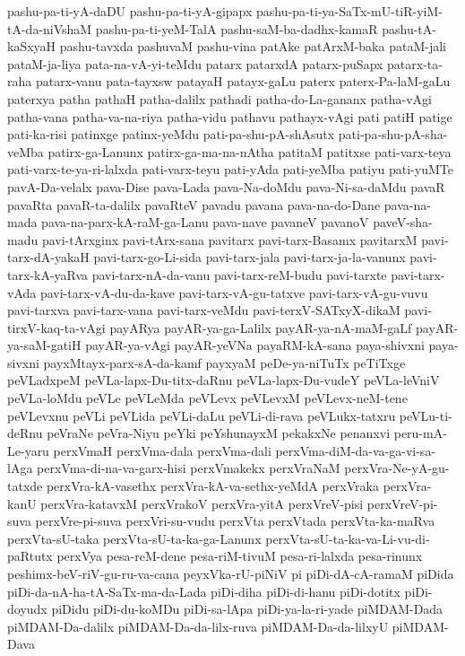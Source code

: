 {pashu-pa-ti-yA-daDU
pashu-pa-ti-yA-gipapx
pashu-pa-ti-ya-SaTx-mU-tiR-yiM-tA-da-niVshaM
pashu-pa-ti-yeM-TalA
pashu-saM-ba-dadhx-kamaR
pashu-tA-kaSxyaH
pashu-tavxda
pashuvaM
pashu-vina
patAke
patArxM-baka
pataM-jali
pataM-ja-liya
pata-na-vA-yi-teMdu
patarx
patarxdA
patarx-puSapx
patarx-ta-raha
patarx-vanu
pata-tayxsw
patayaH
patayx-gaLu
paterx
paterx-Pa-laM-gaLu
paterxya
patha
pathaH
patha-dalilx
pathadi
patha-do-La-gananx
patha-vAgi
patha-vana
patha-va-na-riya
patha-vidu
pathavu
pathayx-vAgi
pati
patiH
patige
pati-ka-risi
patinxge
patinx-yeMdu
pati-pa-shu-pA-shAsutx
pati-pa-shu-pA-sha-veMba
patirx-ga-Lanunx
patirx-ga-ma-na-nAtha
patitaM
patitxse
pati-varx-teya
pati-varx-te-ya-ri-lalxda
pati-varx-teyu
pati-yAda
pati-yeMba
patiyu
pati-yuMTe
pavA-Da-velalx
pava-Dise
pava-Lada
pava-Na-doMdu
pava-Ni-sa-daMdu
pavaR
pavaRta
pavaR-ta-dalilx
pavaRteV
pavadu
pavana
pava-na-do-Dane
pava-na-mada
pava-na-parx-kA-raM-ga-Lanu
pava-nave
pavaneV
pavanoV
paveV-sha-madu
pavi-tArxginx
pavi-tArx-sana
pavitarx
pavi-tarx-Basamx
pavitarxM
pavi-tarx-dA-yakaH
pavi-tarx-go-Li-sida
pavi-tarx-jala
pavi-tarx-ja-la-vanunx
pavi-tarx-kA-yaRva
pavi-tarx-nA-da-vanu
pavi-tarx-reM-budu
pavi-tarxte
pavi-tarx-vAda
pavi-tarx-vA-du-da-kave
pavi-tarx-vA-gu-tatxve
pavi-tarx-vA-gu-vuvu
pavi-tarxva
pavi-tarx-vana
pavi-tarx-veMdu
pavi-terxV-SATxyX-dikaM
pavi-tirxV-kaq-ta-vAgi
payARya
payAR-ya-ga-Lalilx
payAR-ya-nA-maM-gaLf
payAR-ya-saM-gatiH
payAR-ya-vAgi
payAR-yeVNa
payaRM-kA-sana
paya-shivxni
paya-sivxni
payxMtayx-parx-sA-da-kamf
payxyaM
peDe-ya-niTuTx
peTiTxge
peVLadxpeM
peVLa-lapx-Du-titx-daRnu
peVLa-lapx-Du-vudeY
peVLa-leVniV
peVLa-loMdu
peVLe
peVLeMda
peVLevx
peVLevxM
peVLevx-neM-tene
peVLevxnu
peVLi
peVLida
peVLi-daLu
peVLi-di-rava
peVLukx-tatxru
peVLu-ti-deRnu
peVraNe
peVra-Niyu
peYki
peYshunayxM
pekakxNe
penanxvi
peru-mA-Le-yaru
perxVmaH
perxVma-dala
perxVma-dali
perxVma-diM-da-va-ga-vi-sa-lAga
perxVma-di-na-va-garx-hisi
perxVmakekx
perxVraNaM
perxVra-Ne-yA-gu-tatxde
perxVra-kA-vasethx
perxVra-kA-va-sethx-yeMdA
perxVraka
perxVra-kanU
perxVra-katavxM
perxVrakoV
perxVra-yitA
perxVreV-pisi
perxVreV-pi-suva
perxVre-pi-suva
perxVri-su-vudu
perxVta
perxVtada
perxVta-ka-maRva
perxVta-sU-taka
perxVta-sU-ta-ka-ga-Lanunx
perxVta-sU-ta-ka-va-Li-vu-di-paRtutx
perxVya
pesa-reM-dene
pesa-riM-tivuM
pesa-ri-lalxda
pesa-rinunx
peshimx-beV-riV-gu-ru-va-cana
peyxVka-rU-piNiV
pi
piDi-dA-cA-ramaM
piDida
piDi-da-nA-ha-tA-SaTx-ma-da-Lada
piDi-diha
piDi-di-hanu
piDi-dotitx
piDi-doyudx
piDidu
piDi-du-koMDu
piDi-sa-lApa
piDi-ya-la-ri-yade
piMDAM-Dada
piMDAM-Da-dalilx
piMDAM-Da-da-lilx-ruva
piMDAM-Da-da-lilxyU
piMDAM-Dava
}
